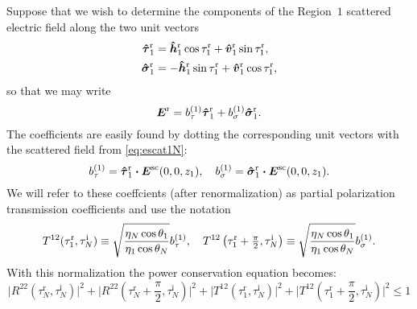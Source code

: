 \documentclass[11pt]{article}
\renewcommand{\inc}{^{\text{i}}}
\renewcommand{\refl}{^{\text{r}}}
\renewcommand{\abs}[1]{\bigl\lvert#1\bigr\rvert}
\newcommand{\piotwo}{{\textstyle\frac{\pi}{2}}}
\begin{document}
Suppose that we wish to determine the components of the Region~$1$
scattered electric field along the two unit vectors 
\begin{subequations}
\begin{align}
  \tauhat_1\refl 
  & = \hhat_1\refl \cos \tau_1\refl + \vhat_1\refl \sin \tau_1\refl, \\
  \sigmahat_1\refl 
  & = - \hhat_1\refl \sin \tau_1\refl + 
  \vhat_1\refl \cos \tau_1\refl,
\end{align}
\end{subequations}
so that we may write
\begin{equation}
  \E\refl = b_\tau\one \tauhat_1\refl + b_\sigma\one \sigmahat_1\refl.
\end{equation}
The coefficients are easily found by dotting the corresponding unit
vectors with the scattered field from \eqref{eq:escat1N}:
\begin{equation}
  b_\tau\one = \tauhat_1\refl \bdot   \E\scat(0,0,z_{1}), \quad
  b_\sigma\one = \sigmahat_1\refl \bdot   \E\scat(0,0,z_1).
\end{equation}
We will refer to these coeffcients (after renormalization)
as partial polarization transmission coefficients and use the notation
\begin{equation}
  T^{12}(\tau_1\refl,\tau_N\inc) \equiv 
  \sqrt{\frac{\eta_N\cos\theta_1}{\eta_1\cos\theta_N}} b_\tau\one, \quad
  T^{12}\left(\tau_1\refl+\piotwo,\tau_N\inc\right) \equiv 
    \sqrt{\frac{\eta_N\cos\theta_1}{\eta_1\cos\theta_N}} b_\sigma\one.
\end{equation}
With this normalization the power conservation equation 
becomes:
\begin{equation}
  \abs{R^{22}(\tau_N\refl,\tau_N\inc)}^2 +
  \abs{R^{22}\left(\tau_N\refl+\piotwo,\tau_N\inc\right)}^2 +
  \abs{T^{12}(\tau_1\refl,\tau_N\inc)}^2 +
  \abs{T^{12}\left(\tau_1\refl+\piotwo,\tau_N\inc\right)}^2
  \leq 1
\end{equation}
\end{document}
